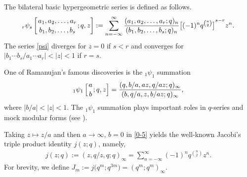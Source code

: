 \documentclass[pdftex]{sigma}
\numberwithin{equation}{section}
\begin{document}
The bilateral basic hypergeometric series is defined as follows.
\begin{align}\label{psi}
_r\psi_s\left[{a_1,a_2,\dots,a_r\atop b_1,b_2,\dots,b_s};q,z\right]
:=\sum_{n=-\infty}^\infty\frac{(a_1,a_2,\dots,a_r;q )_n}
{(b_1,b_2,\dots,b_s;q)_n}{\big[(-1)^{n}q^{n\choose2}\big]}^{s-r}z^n.
\end{align}
The series \eqref{psi} diverges for $z=0$ if $s < r$ and converges for $|b_1\cdots b_s/a_1\cdots a_r|<
|z| < 1$ if $r = s$.


One of Ramanujan's famous discoveries is the $_1\psi_1$ summation \cite[equation (5.2.1)]{GR}
\begin{align}\label{0-5}
{_1\psi_1}\left[{a \atop b};q,z\right]
=\frac{(q,b/a,az,q/az;q)_{\infty}}{(b,q/a,z,b/az;q)_{\infty}},
\end{align}
where $|b/a| < |z| < 1$.  The $_1\psi_1$ summation plays
important roles in $q$-series and mock modular forms (see \cite{AB,B,K}).

Taking $z\mapsto z/a$ and then $a\rightarrow\infty$, $b=0$ in \eqref{0-5} yields the well-known Jacobi's triple product identity $j(z;q)$, namely,
\begin{align*}
j(z;q):=(z,q/z,q;q)_{\infty}=\sum_{n=-\infty}^{\infty}(-1)^nq^{n\choose2}z^n.
\end{align*}
For brevity, we define $J_m:=j\bigl(q^m;q^{3m}\bigr)=(q^m;q^m)_\infty$.
\end{document}
